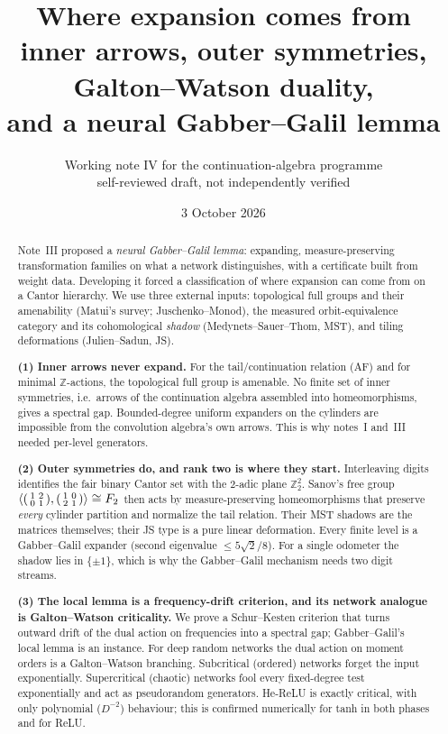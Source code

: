 \documentclass[11pt]{article}
\title{Where expansion comes from\\[4pt]
\large inner arrows, outer symmetries, Galton--Watson duality,\\ and a neural Gabber--Galil lemma}
\author{Working note IV for the continuation-algebra programme\\
\small self-reviewed draft, not independently verified}
\date{3 October 2026}
\theoremstyle{definition}
\theoremstyle{remark}
\newcommand{\Z}{\mathbb Z}
\begin{document}
\maketitle

\begin{abstract}
Note~III proposed a \emph{neural Gabber--Galil lemma}: expanding, measure-preserving transformation families on what a network distinguishes, with a certificate built from weight data. Developing it forced a classification of where expansion can come from on a Cantor hierarchy. We use three external inputs: topological full groups and their amenability (Matui's survey; Juschenko--Monod), the measured orbit-equivalence category and its cohomological \emph{shadow} (Medynets--Sauer--Thom, MST), and tiling deformations (Julien--Sadun, JS).

\textbf{(1) Inner arrows never expand.} For the tail/continuation relation (AF) and for minimal $\Z$-actions, the topological full group is amenable. No finite set of inner symmetries, i.e.\ arrows of the continuation algebra assembled into homeomorphisms, gives a spectral gap. Bounded-degree uniform expanders on the cylinders are impossible from the convolution algebra's own arrows. This is why notes~I and~III needed per-level generators.

\textbf{(2) Outer symmetries do, and rank two is where they start.} Interleaving digits identifies the fair binary Cantor set with the $2$-adic plane $\Z_2^2$. Sanov's free group $\langle\begin{psmallmatrix}1&2\\0&1\end{psmallmatrix},\begin{psmallmatrix}1&0\\2&1\end{psmallmatrix}\rangle\cong F_2$ then acts by measure-preserving homeomorphisms that preserve \emph{every} cylinder partition and normalize the tail relation. Their MST shadows are the matrices themselves; their JS type is a pure linear deformation. Every finite level is a Gabber--Galil expander (second eigenvalue $\le5\sqrt2/8$). For a single odometer the shadow lies in $\{\pm1\}$, which is why the Gabber--Galil mechanism needs two digit streams.

\textbf{(3) The local lemma is a frequency-drift criterion, and its network analogue is Galton--Watson criticality.} We prove a Schur--Kesten criterion that turns outward drift of the dual action on frequencies into a spectral gap; Gabber--Galil's local lemma is an instance. For deep random networks the dual action on moment orders is a Galton--Watson branching. Subcritical (ordered) networks forget the input exponentially. Supercritical (chaotic) networks fool every fixed-degree test exponentially and act as pseudorandom generators. He-ReLU is exactly critical, with only polynomial ($D^{-2}$) behaviour; this is confirmed numerically for tanh in both phases and for ReLU.


\end{abstract}
\end{document}
